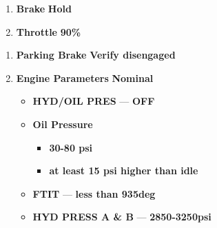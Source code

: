 \begin{checklistenumerate}
    \blueitem[Runup]\cbstart
    \begin{enumerate}
        \item \textbf{Brake} \dotfill \textbf{Hold}
        \item \textbf{Throttle} \dotfill \textbf{90\%}\cbend
    \end{enumerate}
    \begin{enumerate}
        \item \textbf{Parking Brake} \dotfill \textbf{Verify disengaged}
        \item \textbf{Engine Parameters} \dotfill \textbf{Nominal}
        \begin{itemize}
            \item \textbf{HYD/OIL PRES} --- \textbf{OFF}
            \item \textbf{Oil Pressure}
            \begin{itemize}
                \item \textbf{30-80 psi}
                \item \textbf{at least 15 psi higher than idle}
            \end{itemize}
            \item \textbf{FTIT} --- \textbf{less than 935deg}
            \item \textbf{HYD PRESS A \& B} --- \textbf{2850-3250psi}
        \end{itemize}
    \end{enumerate}
\end{checklistenumerate}

\clearpage

